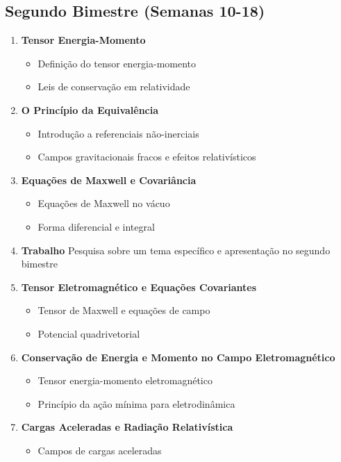 \documentclass[a4paper,12pt]{article}
\begin{document}
\subsection*{Segundo Bimestre (Semanas 10-18)}
\begin{enumerate}
	\item \textbf{Tensor Energia-Momento}
	      \begin{itemize}
		      \item Definição do tensor energia-momento
		      \item Leis de conservação em relatividade
	      \end{itemize}
	\item \textbf{O Princípio da Equivalência}
	      \begin{itemize}
		      \item Introdução a referenciais não-inerciais
		      \item Campos gravitacionais fracos e efeitos relativísticos
	      \end{itemize}
	\item \textbf{Equações de Maxwell e Covariância}
	      \begin{itemize}
		      \item Equações de Maxwell no vácuo
		      \item Forma diferencial e integral
	      \end{itemize}
	\item \textbf{Trabalho} Pesquisa sobre um tema específico e apresentação no segundo
	      bimestre
	\item \textbf{Tensor Eletromagnético e Equações Covariantes}
	      \begin{itemize}
		      \item Tensor de Maxwell e equações de campo
		      \item Potencial quadrivetorial
	      \end{itemize}
	\item \textbf{Conservação de Energia e Momento no Campo Eletromagnético}
	      \begin{itemize}
		      \item Tensor energia-momento eletromagnético
		      \item Princípio da ação mínima para eletrodinâmica
	      \end{itemize}
	\item \textbf{Cargas Aceleradas e Radiação Relativística}
	      \begin{itemize}
		      \item Campos de cargas aceleradas

\end{itemize}
\end{enumerate}
\end{document}

